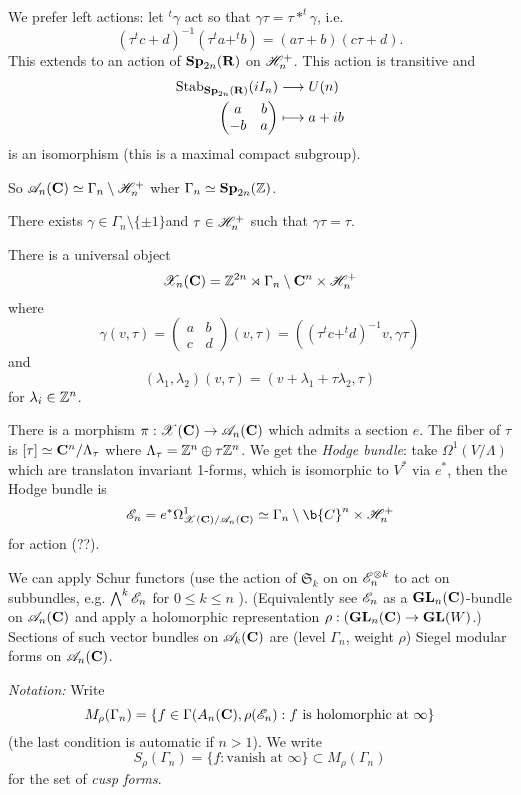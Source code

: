 We prefer left actions: let $^{t}\gamma$ act so that $\gamma\tau = \tau*^{t}\gamma$, i.e.
\[
	(\tau^{t}c + d)^{-1}(\tau^{t}a+^{t}b) = (a\tau + b)(c\tau + d)
.\] 
This extends to an action of $\mathbf{Sp}_{2n}(\mathbf{R})$ on $\mathscr{H}_n^{+}$. This action is transitive and
\begin{align*}
	\operatorname{Stab}_{\mathbf{Sp}_{2n}(\mathbf{R})}(iI_n) &\longrightarrow U(n) \\
	\begin{pmatrix} a & b \\ -b & a \end{pmatrix}  &\longmapsto a + ib
\end{align*}
is an isomorphism (this is a maximal compact subgroup).

So $\mathscr{A}_n(\mathbf{C})\simeq \Gamma_n\setminus \mathscr{H}_n^{+}$ wher $\Gamma_n\simeq \mathbf{Sp}_{2n}(\mathbb Z)$.
\begin{remark}
	There exists $\gamma\in \Gamma_n\setminus \{\pm 1\} $and $\tau\in \mathscr{H}_n^{+}$ such that $\gamma\tau=\tau$.
\end{remark}

There is a universal object
\[
	\mathscr{X}_n(\mathbf{C}) = \mathbb Z^{2n}\rtimes \Gamma_n\setminus\mathbf{C}^{n}\times \mathscr{H}_n^{+}
\] 
where
\[
	\gamma(v,\tau) = \begin{pmatrix} a & b \\ c & d \end{pmatrix} (v,\tau) = ((\tau^{t}c+^{t}d)^{-1}v, \gamma\tau)
\] 
and
\[
	(\lambda_1,\lambda_2)(v,\tau) = (v+\lambda_1+\tau\lambda_2,\tau)
\]
for $\lambda_i\in \mathbb Z^{n}$.

There is a morphism $\pi:\CX(\bb{C})\to \CA_n(\bb{C})$ which admits a section $e$. The fiber of $\tau$ is $[\tau]\simeq\mathbf{C}^{n} /\Lambda_\tau$ where $\Lambda_\tau = \mathbb Z^{n}\oplus\tau \mathbb Z^{n}$. We get the \emph{Hodge bundle}: take $\Omega^{1}(V /\Lambda)$ which are translaton invariant 1-forms, which is isomorphic to $V^{*}$ via $e^{*}$, then the Hodge bundle is
\[
	\CE_n = e^{*}\Omega^{1}_{\CX(\bb{C}) / \CA_n(\bb{C})} \simeq \Gamma_n\setminus\b{C}^{n}\times \H_n^{+}
\]
for action (??).

We can apply Schur functors (use the action of $\mathfrak{S}_k$ on on $\mathscr{E}_n^{\otimes k}$ to act on subbundles, e.g. $\bigwedge^{k}\mathscr{E}_n$ for $0\le k\le n$ ). (Equivalently see $\mathscr{E}_n$ as a $\mathbf{GL}_n(\mathbf{C})$-bundle on $\mathscr{A}_n(\mathbf{C})$ and apply a holomorphic representation $\rho:(\GL_n(\bb{C})\to \GL(W)$.)
Sections of such vector bundles on $\mathscr{A}_k(\mathbf{C})$ are (level $\Gamma_n$, weight $\rho$) Siegel modular forms on $\mathscr{A}_n(\mathbf{C})$.

\emph{Notation:} Write
\[
	M_\rho(\Gamma_n) = \left\{ f\in \Gamma(A_n(\mathbf{C}),\rho(\mathscr{E}_n):f\text{ is holomorphic at }\infty \right\} 
\]
(the last condition is automatic if $n>1$). We write
\[
S_\rho(\Gamma_n) = \{f:\text{vanish at }\infty\} \subset M_\rho(\Gamma_n)
\]
for the set of \emph{cusp forms}.

